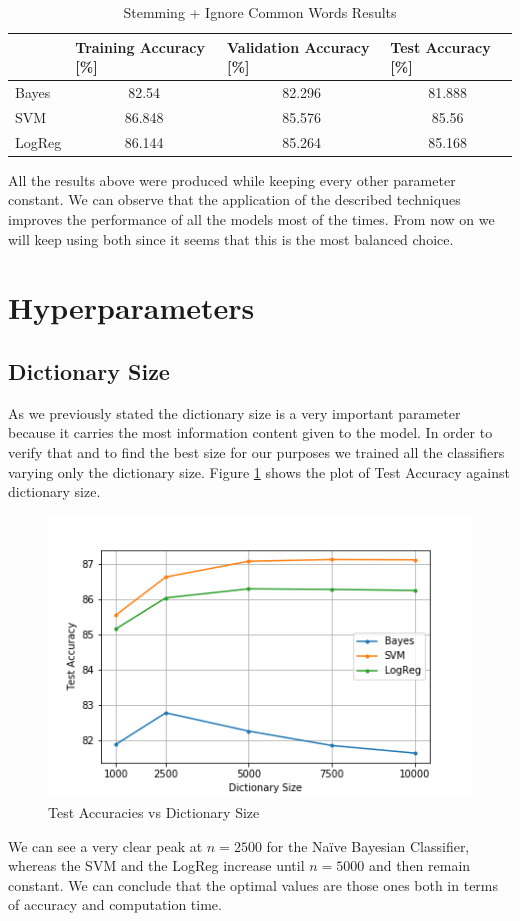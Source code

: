 \documentclass[10pt,a4paper]{report}
\begin{document}
\begin{table}[!ht]
\centering
\begin{tabular}{|l|c|c|c|}
\hline
 & \multicolumn{1}{l|}{Training Accuracy {[}\%{]}} & \multicolumn{1}{l|}{Validation Accuracy {[}\%{]}} & \multicolumn{1}{l|}{Test Accuracy {[}\%{]}} \\ \hline
Bayes  & 82.54  & 82.296 & 81.888 \\ \hline
SVM    & 86.848 & 85.576 & 85.56  \\ \hline
LogReg & 86.144 & 85.264 & 85.168 \\ \hline
\end{tabular}
\caption{Stemming + Ignore Common Words Results}
\label{tab:stemming_ignore_common}
\end{table}
All the results above were produced while keeping every other parameter constant. We can observe that the application of the described techniques improves the performance of all the models most of the times. From now on we will keep using both since it seems that this is the most balanced choice.
\section{Hyperparameters}
\subsection{Dictionary Size}
As we previously stated the dictionary size is a very important parameter because it carries the most information content given to the model. In order to verify that and to find the best size for our purposes we trained all the classifiers varying only the dictionary size. Figure \ref{fig:test_acc} shows the plot of Test Accuracy against dictionary size.
\begin{figure}[!ht]
\centering
\includegraphics[width=0.6\linewidth]{test_acc.png}
\caption{Test Accuracies vs Dictionary Size}
\label{fig:test_acc}
\end{figure}
We can see a very clear peak at $n=2500$ for the Na\"{i}ve Bayesian Classifier, whereas the SVM and the LogReg increase until $n=5000$ and then remain constant. We can conclude that the optimal values are those ones both in terms of accuracy and computation time.
\end{document}
